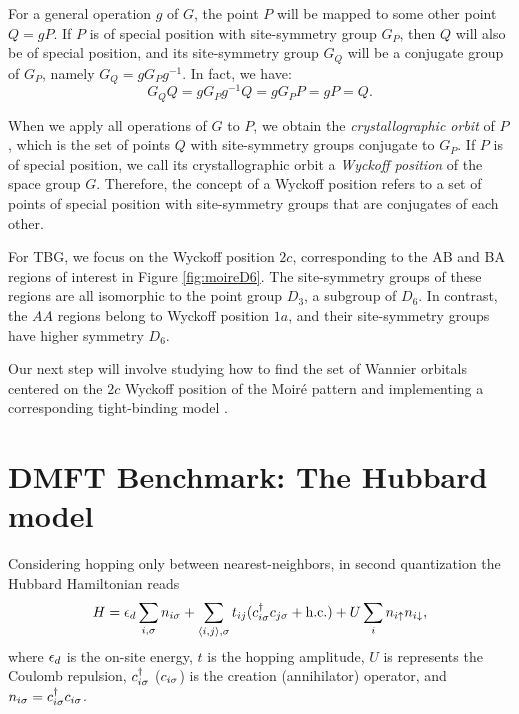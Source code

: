 \documentclass[12pt]{report}
\begin{document}
For a general operation $g$ of $G$, the point $P$ will be mapped to some other point $Q = g P$. If $P$ is of special position with site-symmetry group $G_P$, then $Q$ will also be of special position, and its site-symmetry group $G_Q$ will be a conjugate group of $G_P$, namely $G_Q = g G_P g^{-1}$. In fact, we have:
\begin{equation} \label{eq:special-position}
G_Q Q = g G_P g^{-1} Q = g G_P P = g P = Q.
\end{equation}

When we apply all operations of $G$ to $P$, we obtain the \textit{crystallographic orbit} of $P$, which is the set of points $Q$ with site-symmetry groups conjugate to $G_P$. If $P$ is of special position, we call its crystallographic orbit a \textit{Wyckoff position} of the space group $G$. Therefore, the concept of a Wyckoff position refers to a set of points of special position with site-symmetry groups that are conjugates of each other.

\n

For TBG, we focus on the Wyckoff position $2c$, corresponding to the AB and BA regions of interest in Figure \ref{fig:moireD6}. The site-symmetry groups of these regions are all isomorphic to the point group $D_3$, a subgroup of $D_6$. In contrast, the $AA$ regions belong to Wyckoff position $1a$, and their site-symmetry groups have higher symmetry $D_6$.

Our next step will involve studying how to find the set of Wannier orbitals centered on the $2c$ Wyckoff position of the Moiré pattern and implementing a corresponding tight-binding model \cite{thesis_rennella}.

\section{DMFT Benchmark: The Hubbard model} \label{sec:hubbard}

Considering hopping only between nearest-neighbors, in second quantization the Hubbard Hamiltonian reads
\begin{equation} \label{eq:hubbard-hamiltonian}
H = \epsilon_d \sum_{i, {\sigma}} n_{i{\sigma}} +  \sum_{\left\langle i , j \right\rangle, {\sigma}} t_{ij} (c_{i{\sigma}}^\dagger c_{j{\sigma}} + {\text{h.c.}})
+ U \sum_{i} n_{i{\uparrow}} n_{i{\downarrow}},
\end{equation}
where $\epsilon_d$ is the on-site energy, $t$ is the hopping amplitude, $U$ is represents the Coulomb repulsion, $c_{i{\sigma}}^\dagger$ ($c_{i{\sigma}}$) is the creation (annihilator) operator, and $n_{i{\sigma}} = c_{i{\sigma}}^\dagger c_{i{\sigma}}$.
\end{document}
